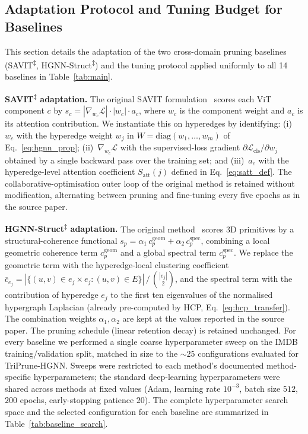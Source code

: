 \documentclass[10pt]{article}
\theoremstyle{plain}
\theoremstyle{definition}
\begin{document}
\subsection{Adaptation Protocol and Tuning Budget for Baselines}
\label{app:baseline_adaptation}

This section details the adaptation of the two cross-domain pruning baselines (SAVIT\textsuperscript{$\ddagger$}, HGNN-Struct\textsuperscript{$\ddagger$}) and the tuning protocol applied uniformly to all 14 baselines in Table~\ref{tab:main}.

\textbf{SAVIT\textsuperscript{$\ddagger$} adaptation.} The original SAVIT formulation~\citep{zheng2022savit} scores each ViT component $c$ by $s_c = |\nabla_{w_c}\!\mathcal{L}| \cdot |w_c| \cdot a_c$, where $w_c$ is the component weight and $a_c$ is its attention contribution. We instantiate this on hyperedges by identifying: (i)~$w_c$ with the hyperedge weight $w_j$ in $W=\mathrm{diag}(w_1,\ldots,w_m)$ of Eq.~\eqref{eq:hgnn_prop}; (ii)~$\nabla_{w_c}\!\mathcal{L}$ with the supervised-loss gradient $\partial\mathcal{L}_{\mathrm{cls}}/\partial w_j$ obtained by a single backward pass over the training set; and (iii)~$a_c$ with the hyperedge-level attention coefficient $S_{\mathrm{att}}(j)$ defined in Eq.~\eqref{eq:satt_def}. The collaborative-optimisation outer loop of the original method is retained without modification, alternating between pruning and fine-tuning every five epochs as in the source paper.

\textbf{HGNN-Struct\textsuperscript{$\ddagger$} adaptation.} The original method~\citep{jiang2023structure} scores 3D primitives by a structural-coherence functional
$s_p = \alpha_1\,c_p^{\mathrm{geom}}
     + \alpha_2\,c_p^{\mathrm{spec}}$,
combining a local geometric coherence term $c_p^{\mathrm{geom}}$ and a global spectral term $c_p^{\mathrm{spec}}$. We replace the geometric term with the hyperedge-local clustering coefficient
$\bar c_{e_j} = |\{(u,v)\in e_j\!\times\!e_j : (u,v)\in E\}|
                \,/\,\binom{|e_j|}{2}$,
and the spectral term with the contribution of hyperedge $e_j$ to the first ten eigenvalues of the normalised hypergraph Laplacian (already pre-computed by HCP, Eq.~\eqref{eq:hcp_transfer}). The combination weights $\alpha_1,\alpha_2$ are kept at the values reported in the source paper. The pruning schedule (linear retention decay) is retained unchanged. For every baseline we performed a single coarse hyperparameter sweep on the IMDB training/validation split, matched in size to the $\sim\!25$ configurations evaluated for TriPrune-HGNN. Sweeps were restricted to each method's documented method-specific hyperparameters; the standard deep-learning hyperparameters were shared across methods at fixed values (Adam, learning rate $10^{-3}$, batch size $512$, $200$ epochs, early-stopping patience $20$). The complete hyperparameter search space and the selected configuration for each baseline are summarized in Table~\ref{tab:baseline_search}.
\end{document}
